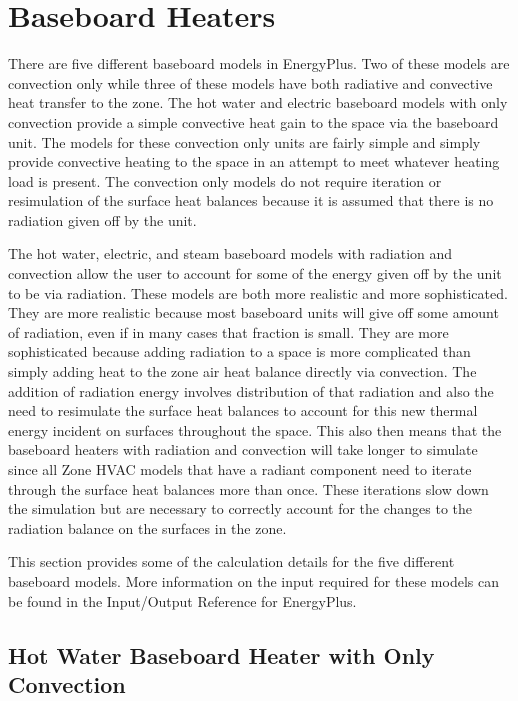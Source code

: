 \section{Baseboard Heaters }\label{baseboard-heaters}

There are five different baseboard models in EnergyPlus.  Two of these models are convection only while three of these models have both radiative and convective heat transfer to the zone.  The hot water and electric baseboard models with only convection provide a simple convective heat gain to the space via the baseboard unit.  The models for these convection only units are fairly simple and simply provide convective heating to the space in an attempt to meet whatever heating load is present.  The convection only models do not require iteration or resimulation of the surface heat balances because it is assumed that there is no radiation given off by the unit.

The hot water, electric, and steam baseboard models with radiation and convection allow the user to account for some of the energy given off by the unit to be via radiation.  These models are both more realistic and more sophisticated.  They are more realistic because most baseboard units will give off some amount of radiation, even if in many cases that fraction is small.  They are more sophisticated because adding radiation to a space is more complicated than simply adding heat to the zone air heat balance directly via convection.  The addition of radiation energy involves distribution of that radiation and also the need to resimulate the surface heat balances to account for this new thermal energy incident on surfaces throughout the space.  This also then means that the baseboard heaters with radiation and convection will take longer to simulate since all Zone HVAC models that have a radiant component need to iterate through the surface heat balances more than once.  These iterations slow down the simulation but are necessary to correctly account for the changes to the radiation balance on the surfaces in the zone.

This section provides some of the calculation details for the five different baseboard models.  More information on the input required for these models can be found in the Input/Output Reference for EnergyPlus.

\subsection{Hot Water Baseboard Heater with Only Convection}\label{hot-water-baseboard-heater-with-only-convection}

